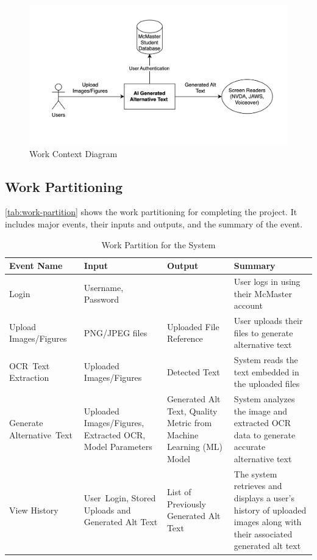 \documentclass[12pt]{article}
\begin{document}
\begin{figure}[H] %
  \centering
  \includegraphics[width=\textwidth]{images/work-context-diagram.png}
  \caption{Work Context Diagram}
  \label{fig:work-context}
\end{figure}
\FloatBarrier   %

\subsection{Work Partitioning}
\autoref{tab:work-partition} shows the work partitioning for completing the project. It includes major events, 
their inputs and outputs, and the summary of the event.

\begin{table}[H]
  \centering
  \caption{Work Partition for the System}
  \label{tab:work-partition}
  \begin{tabular}{ |p{3cm}|p{3cm}|p{3cm}|p{4cm}| }
    \hline
    \textbf{Event Name} & \textbf{Input} & \textbf{Output} & \textbf{Summary} \\
    \hline
    Login & Username, Password &  & User logs in using their McMaster account \\
    \hline
    Upload \mbox{Images/Figures} & PNG/JPEG files & Uploaded File Reference & User uploads their files to generate alternative text \\
    \hline
    \mbox{OCR Text} \mbox{Extraction} & Uploaded \mbox{Images/Figures} & Detected Text & System reads the text embedded in the uploaded files \\
    \hline
    Generate \mbox{Alternative Text} & Uploaded \mbox{Images/Figures}, Extracted OCR, Model Parameters & Generated Alt Text, Quality Metric from Machine Learning (ML) Model & System analyzes the image and extracted OCR data to generate accurate alternative text \\
    \hline
    View History & \mbox{User Login,} Stored Uploads and Generated Alt Text & List of Previously Generated Alt Text & The system retrieves and displays a user’s history of uploaded images along with their associated generated alt text \\
    \hline
  \end{tabular}
\end{table}
\end{document}
